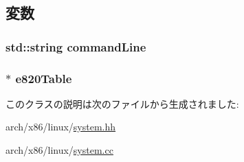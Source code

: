 \subsection{変数}
\hypertarget{classLinuxX86System_a3970bf75d55eef6014911ee4756e783c}{
\subsubsection[{commandLine}]{\setlength{\rightskip}{0pt plus 5cm}std::string {\bf commandLine}}}
\label{classLinuxX86System_a3970bf75d55eef6014911ee4756e783c}
\hypertarget{classLinuxX86System_ab2edb73e83272dddc25211ddfdc6c7d4}{
\subsubsection[{e820Table}]{$\ast$ {\bf e820Table}}}
\label{classLinuxX86System_ab2edb73e83272dddc25211ddfdc6c7d4}


このクラスの説明は次のファイルから生成されました:\begin{DoxyCompactItemize}
\item 
arch/x86/linux/\hyperlink{arch_2x86_2linux_2system_8hh}{system.hh}\item 
arch/x86/linux/\hyperlink{arch_2x86_2linux_2system_8cc}{system.cc}\end{DoxyCompactItemize}
